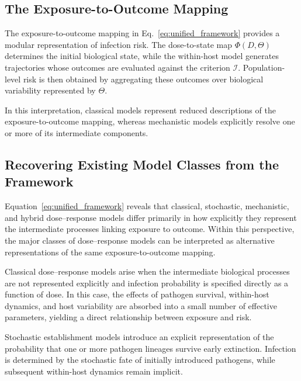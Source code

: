 \documentclass[11pt]{article}
\begin{document}
\subsection{The Exposure-to-Outcome Mapping}


The exposure-to-outcome mapping in Eq.~\eqref{eq:unified_framework}
provides a modular representation of infection risk.
The dose-to-state map $\Phi(D,\Theta)$ determines
the initial biological state, while the within-host
model generates trajectories whose outcomes are
evaluated against the criterion $\mathcal{I}$.
Population-level risk is then obtained by
aggregating these outcomes over biological
variability represented by $\Theta$.


In this interpretation, classical models represent
reduced descriptions of the exposure-to-outcome
mapping, whereas mechanistic models explicitly
resolve one or more of its intermediate components.





\subsection{Recovering Existing Model Classes from the Framework}

Equation~\eqref{eq:unified_framework}  reveals that classical, stochastic, mechanistic, and hybrid dose--response models differ primarily in how explicitly they represent the intermediate processes linking exposure to outcome. Within this perspective, the major classes of dose--response models can be interpreted as alternative representations of the same exposure-to-outcome mapping.

Classical dose--response models arise when the intermediate biological processes are not represented explicitly and infection probability is specified directly as a function of dose. In this case, the effects of pathogen survival, within-host dynamics, and host variability are absorbed into a small number of effective parameters, yielding a direct relationship between exposure and risk.

Stochastic establishment models introduce an explicit representation of the probability that one or more pathogen lineages survive early extinction. Infection is determined by the stochastic fate of initially introduced pathogens, while subsequent within-host dynamics remain implicit.
\end{document}
